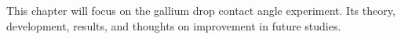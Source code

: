 

This chapter will focus on the gallium drop contact angle experiment. Its theory, development, results, and thoughts on improvement in future studies. 


